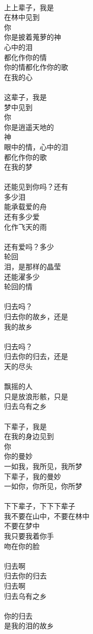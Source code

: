 \\
上上辈子，我是\\
在林中见到\\
你\\
你是披着蒐萝的神\\
心中的泪\\
都化作你的情\\
你的情都化作你的歌\\
在我的心\\
\\
这辈子，我是\\
梦中见到\\
你\\
你是逍遥天地的\\
神\\
眼中的情，心中的泪\\
都化作你的歌\\
在我的梦\\
\\
还能见到你吗？还有\\
多少泪\\
能承载爱的舟\\
还有多少爱\\
化作飞天的雨\\
\\
还有爱吗？多少\\
轮回\\
泪，是那样的晶莹\\
还能濯多少\\
轮回的情\\
\\
归去吗？\\
归去你的故乡，还是\\
我的故乡\\
\\
归去吗？\\
归去你的归去，还是\\
天的尽头\\
\\
飘摇的人\\
只是放浪形骸，只是\\
归去乌有之乡\\
\\
下辈子，我是\\
在我的身边见到\\
你\\
你的曼妙\\
一如我，我所见，我所梦\\
下辈子，我的曼妙\\
一如你，你所见，你所梦\\
\\
下下辈子，下下下辈子\\
我不要在山中，不要在林中\\
不要在梦中\\
我只要我着你手\\
吻在你的脸\\
\\
归去啊\\
归去你的归去\\
归去啊\\
归去乌有之乡\\
\\
你的归去\\
是我的泪的故乡
